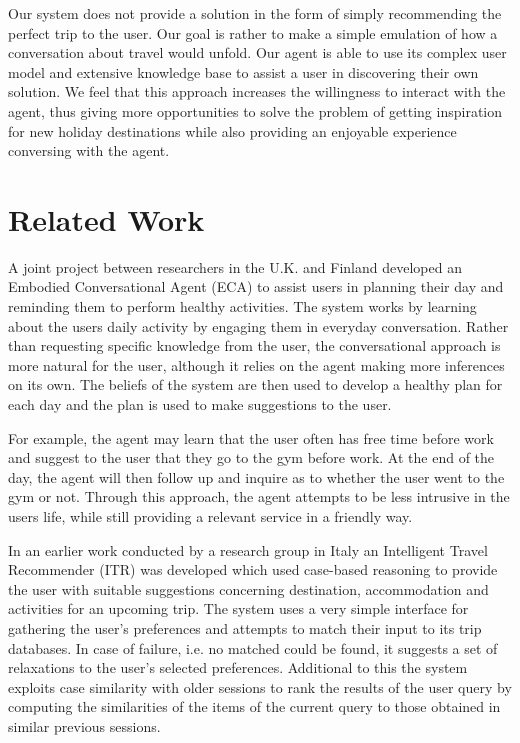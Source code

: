 \documentclass[11pt]{article} %
\begin{document}
Our system does not provide a solution in the form of simply recommending the perfect trip to the user. 
Our goal is rather to make a simple emulation of how a conversation about travel would unfold. 
Our agent is able to use its complex user model and extensive
knowledge base to assist a user in discovering their own solution.
We feel that this approach increases the willingness to interact
with the agent, thus giving more opportunities to solve the problem of getting inspiration for new holiday destinations while also providing an enjoyable experience conversing with the agent.

\section{Related Work}
A joint project between researchers in the U.K. and Finland \cite{cavazza08}
developed an Embodied Conversational Agent (ECA) to assist
users in planning their day and reminding them to perform
healthy activities. The system works by learning about the
users daily activity by engaging them in everyday conversation.
Rather than requesting specific knowledge from the user, the
conversational approach is more natural for the user, although
it relies on the agent making more inferences on its own. The
beliefs of the system are then used to develop a healthy plan
for each day and the plan is used to make suggestions to the user.

For example, the agent may learn that the user often has free
time before work and suggest to the user that they go to the
gym before work. At the end of the day, the agent will then
follow up and inquire as to whether the user went to the gym
or not. Through this approach, the agent attempts to be less
intrusive in the users life, while still providing a relevant
service in a friendly way.

In an earlier work conducted by a research group in Italy \cite{ricci02} an
Intelligent Travel Recommender (ITR) was developed which used
case-based reasoning to provide the user with suitable
suggestions concerning destination, accommodation and
activities for an upcoming trip. The system uses a very
simple interface for gathering the user's preferences and
attempts to match their input to its trip databases. In case
of failure, i.e. no matched could be found, it suggests a set
of relaxations to the user's selected preferences. Additional
to this the system exploits case similarity with older sessions
to rank the results of the user query by computing the
similarities of the items of the current query to those
obtained in similar previous sessions.
\end{document}
